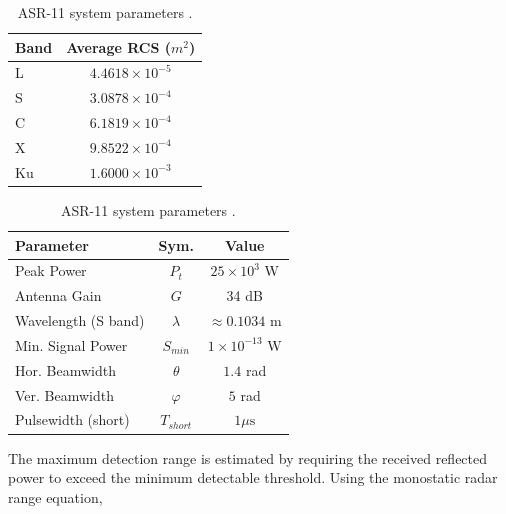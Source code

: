 \begin{table}[ht]
    \centering
    \begin{minipage}{0.45\textwidth}
        \centering
        \caption{Average RCS values of air balloon \cite{HUANG2024DetectionRadar.}.}
        \label{tab:rcs_values}
        \begin{tabular}{lc}
            \toprule
            Band & Average RCS ($m^2$) \\
            \midrule
            L  & $4.4618 \times 10^{-5}$ \\
            S  & $3.0878 \times 10^{-4}$ \\
            C  & $6.1819 \times 10^{-4}$ \\
            X  & $9.8522 \times 10^{-4}$ \\
            Ku & $1.6000 \times 10^{-3}$ \\
            \bottomrule
        \end{tabular}
    \end{minipage}
    \hfill
    \begin{minipage}{0.5\textwidth}
        \centering
        \caption{ASR-11 system parameters \cite{ForecastInternational2014ASR-11DASROrientation}.}
        \label{tab:asr11_parameters}
        \begin{tabular}{lcc}
            \toprule
            \textbf{Parameter} & \textbf{Sym.} & \textbf{Value} \\
            \midrule
            Peak Power & $P_t$ & $25 \times 10^3$ W \\
            Antenna Gain & $G$ & 34 dB \\
            Wavelength (S band) & $\lambda$ & $\approx 0.1034$ m \\
            Min. Signal Power & $S_{min}$ & $1 \times 10^{-13}$ W \\
            Hor. Beamwidth &  $ \theta$ & $1.4$ rad \\
            Ver. Beamwidth & $\varphi$ &  $5$ rad\\
            Pulsewidth (short) & $T_{short}$& $1 \mu\text{s}$\\ 
            
            \bottomrule
        \end{tabular}
    \end{minipage}
\end{table}



The maximum detection range is estimated by requiring the received reflected power to exceed the minimum detectable threshold. Using the monostatic radar range equation,

